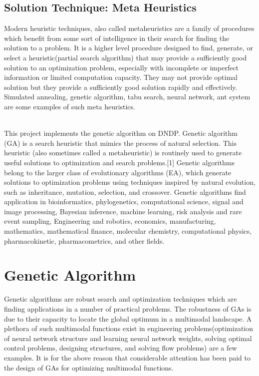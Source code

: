 \documentclass[a4paper, 12pt]{article}
\begin{document}
\subsection{Solution Technique: Meta Heuristics}
Modern heuristic techniques, also called metaheuristics are a family of procedures which benefit from some sort of intelligence in their search for finding the solution to a problem. It is a higher level procedure designed to find, generate, or select a heuristic(partial search algorithm) that may provide a sufficiently good solution to an optimization problem, especially with incomplete or imperfect information or limited computation capacity. They may not provide optimal solution but they provide a sufficiently good solution rapidly and effectively. Simulated annealing, genetic algorithm, tabu search, neural network, ant system are some examples of such meta heuristics.\par
\noindent
\\This project implements the genetic algorithm on DNDP. Genetic algorithm (GA) is a search heuristic that mimics the process of natural selection. This heuristic (also sometimes called a metaheuristic) is routinely used to generate useful solutions to optimization and search problems.[1] Genetic algorithms belong to the larger class of evolutionary algorithms (EA), which generate solutions to optimization problems using techniques inspired by natural evolution, such as inheritance, mutation, selection, and crossover. Genetic algorithms find application in bioinformatics, phylogenetics, computational science, signal and image processing, Bayesian inference, machine learning, risk analysis and rare event sampling, Engineering and robotics, economics, manufacturing, mathematics, mathematical finance, molecular chemistry, computational physics, pharmacokinetic, pharmacometrics, and other fields.\par
\newpage
\section{Genetic Algorithm}
Genetic algorithms are robust search and optimization techniques which are finding applications in a number of practical problems. The robustness of GAs is due to their capacity to locate the global optimum in a multimodal landscape. A plethora of such multimodal functions exist in engineering problems(optimization of neural network structure and learning neural network weights, solving optimal control problems, designing structures, and solving flow problems) are a few examples. It is for the above reason that considerable attention has been paid to the design of GAs for optimizing multimodal functions.\par
\noindent
\end{document}
